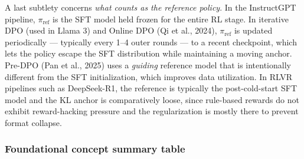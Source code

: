 A last subtlety concerns \emph{what counts as the reference policy}. In the InstructGPT pipeline, \(\pi_{\text{ref}}\) is the SFT model held frozen for the entire RL stage. In iterative DPO (used in Llama 3) and Online DPO (Qi et al., 2024), \(\pi_{\text{ref}}\) is updated periodically --- typically every 1--4 outer rounds --- to a recent checkpoint, which lets the policy escape the SFT distribution while maintaining a moving anchor. Pre-DPO (Pan et al., 2025) uses a \emph{guiding} reference model that is intentionally different from the SFT initialization, which improves data utilization. In RLVR pipelines such as DeepSeek-R1, the reference is typically the post-cold-start SFT model and the KL anchor is comparatively loose, since rule-based rewards do not exhibit reward-hacking pressure and the regularization is mostly there to prevent format collapse.

\subsubsection{Foundational concept summary table}\label{foundational-concept-summary-table}


